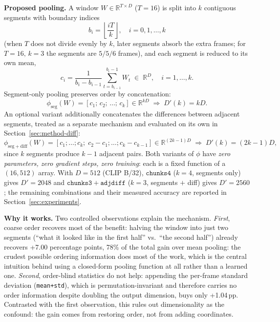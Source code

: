 \documentclass[11pt]{article}
\begin{document}
\textbf{Proposed pooling.} A window $W \in \mathbb{R}^{T \times D}$
($T{=}16$) is split into $k$ contiguous segments with boundary indices
\begin{equation}
b_i = \left\lfloor \frac{iT}{k} \right\rfloor, \quad i = 0,1,\ldots,k
\end{equation}
(when $T$ does not divide evenly by $k$, later segments absorb the extra
frames; for $T{=}16,\,k{=}3$ the segments are $5/5/6$ frames), and each
segment is reduced to its own mean,
\begin{equation}
c_i = \frac{1}{b_i - b_{i-1}} \sum_{t=b_{i-1}}^{b_i - 1} W_t \;\in\; \mathbb{R}^D,
\quad i = 1,\ldots,k .
\end{equation}
Segment-only pooling preserves order by concatenation:
\begin{equation}
\phi_{\mathrm{seg}}(W) = [c_1;\,c_2;\,\ldots;\,c_k] \in \mathbb{R}^{kD}
\;\Longrightarrow\; D'(k) = kD .
\end{equation}
An optional variant additionally concatenates the differences between
adjacent segments, treated as a separate mechanism and evaluated on its own
in Section~\ref{sec:method-diff}:
\begin{equation}
\phi_{\mathrm{seg+diff}}(W) = [c_1;\ldots;c_k;\; c_2{-}c_1;\ldots;c_k{-}c_{k-1}]
\in \mathbb{R}^{(2k-1)D}
\;\Longrightarrow\; D'(k) = (2k-1)D ,
\end{equation}
since $k$ segments produce $k{-}1$ adjacent pairs. Both variants of $\phi$
have \emph{zero parameters, zero gradient steps, zero training}: each is a
fixed function of a $(16,512)$ array. With $D{=}512$ (CLIP B/32),
$\mathtt{chunks4}$ ($k{=}4$, segments only) gives $D'{=}2048$ and
$\mathtt{chunks3{+}adjdiff}$ ($k{=}3$, segments $+$ diff) gives $D'{=}2560$;
the remaining combinations and their measured accuracy are reported in
Section~\ref{sec:experiments}.

\textbf{Why it works.} Two controlled observations explain the
mechanism. \emph{First}, coarse order recovers most of the benefit: halving
the window into just two segments (``what it looked like in the first
half'' vs.\ ``the second half'') already recovers +7.00 percentage points,
78\% of the total gain over mean pooling: the crudest possible ordering
information does most of the work, which is the central intuition behind
using a closed-form pooling function at all rather than a learned one.
\emph{Second}, order-blind statistics do not help: appending the per-frame
standard deviation (\texttt{mean+std}), which is permutation-invariant and
therefore carries no order information despite doubling the output
dimension, buys only +1.04\,pp. Contrasted with the first observation, this
rules out dimensionality as the confound: the gain comes from restoring
order, not from adding coordinates.
\end{document}
